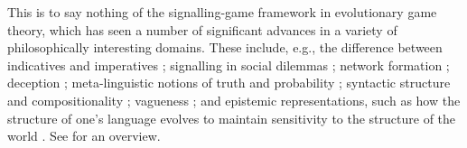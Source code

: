 \documentclass{article}
\begin{document}

This is to say nothing of the signalling-game framework \citep{Lewis-1969, Skyrms-1996, Skyrms-2010-Signals} in evolutionary game theory, which has seen a number of significant advances in a variety of philosophically interesting domains. These include, e.g., the difference between indicatives and imperatives \citep{Huttegger-2007b, Zollman-2011}; signalling in social dilemmas \citep{Wagner-2014}; network formation \citep{Pemantle-Skyrms-2004, Barrett-et-al-2017}; deception \citep{Zollman-et-al-2013, Martinez-2015, Skyrms-Barrett-2018}; meta-linguistic notions of truth and probability \citep{Barrett-2016, Barrett-2017}; syntactic structure and compositionality \citep{Franke-2016, Steinert-Threlkeld-2016, Barrett-et-al-2018, LaCroix-2019-Logic-Game}; vagueness \citep{OConnor-2014}; and epistemic representations, such as how the structure of one’s language evolves to maintain sensitivity to the structure of the world \citep{Barrett-LaCroix-2019}. See \citet{LaCroix-2019-Signaling-Models} for an overview.

\small


\end{document}
